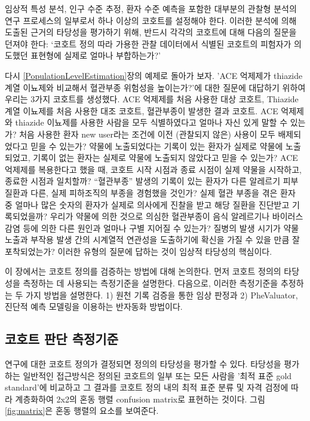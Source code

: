 \documentclass[10.5pt]{book}
\theoremstyle{definition}
\theoremstyle{definition}
\theoremstyle{definition}
\theoremstyle{remark}
\begin{document}
임상적 특성 분석, 인구 수준 추정, 환자 수준 예측을 포함한 대부분의
관찰형 분석의 연구 프로세스의 일부로서 하나 이상의 코호트를 설정해야
한다. 이러한 분석에 의해 도출된 근거의 타당성을 평가하기 위해, 반드시
각각의 코호트에 대해 다음의 질문을 던져야 한다: `코호트 정의 따라 가용한
관찰 데이터에서 식별된 코호트의 피험자가 의도했던 표현형에 실제로 얼마나
부합하는가?'

다시 \ref{PopulationLevelEstimation}장의 예제로 돌아가 보자. 'ACE
억제제가 thiazide 계열 이뇨제와 비교해서 혈관부종 위험성을 높이는가?'에
대한 질문에 대답하기 위하여 우리는 3가지 코호트를 생성했다. ACE 억제제를
처음 사용한 대상 코호트, Thiazide 계열 이뇨제를 처음 사용한 대조 코호트,
혈관부종이 발생한 결과 코호트. ACE 억제제와 thiazide 이뇨제를 사용한
사람을 모두 식별하였다고 얼마나 자신 있게 말할 수 있는가? 처음 사용한
환자 new user라는 조건에 이전 (관찰되지 않은) 사용이 모두 배제되었다고
믿을 수 있는가? 약물에 노출되었다는 기록이 있는 환자가 실제로 약물에
노출되었고, 기록이 없는 환자는 실제로 약물에 노출되지 않았다고 믿을 수
있는가? ACE 억제제를 복용한다고 했을 때, 코호트 시작 시점과 종료 시점이
실제 약물을 시작하고, 종료한 시점과 일치할까? ``혈관부종'' 발생의 기록이
있는 환자가 다른 알레르기 피부 질환과 다른, 실제 피하조직의 부종을
경험했을 것인가? 실제 혈관 부종을 겪은 환자 중 얼마나 많은 숫자의 환자가
실제로 의사에게 진찰을 받고 해당 질환을 진단받고 기록되었을까? 우리가
약물에 의한 것으로 의심한 혈관부종이 음식 알레르기나 바이러스 감염 등에
의한 다른 원인과 얼마나 구별 지어질 수 있는가? 질병의 발생 시기가 약물
노출과 부작용 발생 간의 시계열적 연관성을 도출하기에 확신을 가질 수 있을
만큼 잘 포착되었는가? 이러한 유형의 질문에 답하는 것이 임상적 타당성의
핵심이다.

이 장에서는 코호트 정의를 검증하는 방법에 대해 논의한다. 먼저 코호트
정의의 타당성을 측정하는 데 사용되는 측정기준을 설명한다. 다음으로,
이러한 측정기준을 추정하는 두 가지 방법을 설명한다. 1) 원천 기록 검증을
통한 임상 판정과 2) PheValuator, 진단적 예측 모델링을 이용하는 반자동화
방법이다.

\subsection{코호트 판단 측정기준}\label{--}

연구에 대한 코호트 정의가 결정되면 정의의 타당성을 평가할 수 있다.
타당성을 평가하는 일반적인 접근방식은 정의된 코호트의 일부 또는 모든
사람을 '최적 표준 gold standard'에 비교하고 그 결과를 코호트 정의 내의
최적 표준 분류 및 자격 검정에 따라 계층화하여 2x2의 혼동 행렬 confusion
matrix로 표현하는 것이다. 그림 \ref{fig:matrix}은 혼동 행렬의 요소를
보여준다.
\end{document}
